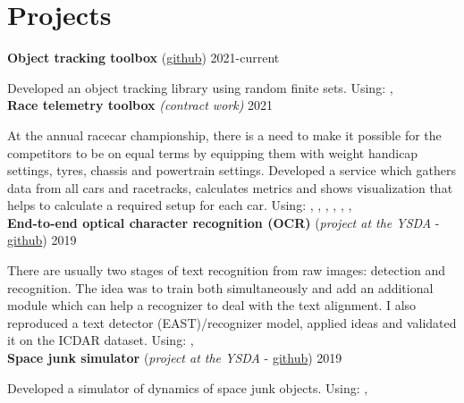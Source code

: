 \section*{\sectionformat Projects}
\textbf{Object tracking toolbox} (\href{https://github.com/neer201/Multi-Object-Tracking-for-Automotive-Systems-in-python}{github}) \hfill 2021-current
\par
Developed an object tracking library using random finite sets.
Using: , 
\\
% 
\textbf{Race telemetry toolbox} \textit{(contract work)} \hfill 2021
\par
At the annual racecar championship, there is a need to make it possible for the competitors to be on equal terms by equipping them with weight handicap settings, tyres, chassis and powertrain settings.
Developed a service which gathers data from all cars and racetracks, calculates metrics and shows visualization that helps to calculate a required setup for each car.
Using: , , , , , , 
\\
\textbf{End-to-end optical character recognition (OCR)} (\textit{project at the YSDA} - \href{https://github.com/neer201/end2end_OCR}{github})  \hfill 2019
\par
There are usually two stages of text recognition from raw images: detection and recognition. The idea was to train both simultaneously and add an additional module which can help a recognizer to deal with the text alignment. I also reproduced a text detector (EAST)/recognizer model, applied ideas and validated it on the ICDAR dataset.
Using: , 
% 
\\
\textbf{Space junk simulator} (\textit{project at the YSDA} - \href{https://github.com/neer201/space_junk_simulator}{github})   \hfill 2019
\par
Developed a simulator of dynamics of space junk objects.
Using: , 
